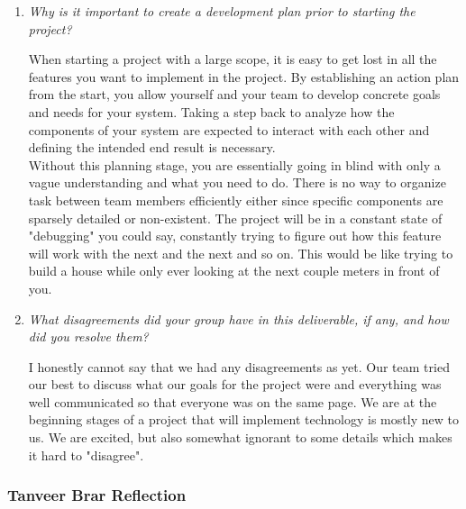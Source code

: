 \documentclass{article}
\begin{document}
\begin{enumerate}

  \item \textit{Why is it important to create a development plan prior to starting the project?}

    When starting a project with a large scope, it is easy to get lost in all the features you want to implement in the project.
    By establishing an action plan from the start, you allow yourself and your team to develop concrete goals and needs for your system. Taking a step back to analyze how the components of your system are expected to interact with each other and defining the intended end result is necessary.\\

    Without this planning stage, you are essentially going in blind with only a vague understanding and what you need to do. There is
    no way to organize task between team members efficiently either since specific components are sparsely detailed or non-existent. The
    project will be in a constant state of "debugging" you could say, constantly trying to figure out how this feature will work with the
    next and the next and so on. This would be like trying to build a house while only ever looking at the next couple meters in front of you.

  \item \textit{What disagreements did your group have in this deliverable, if any, and how did you resolve them?}
  
  I honestly cannot say that we had any disagreements as yet. Our team tried our best to discuss what our goals for the project were and
  everything was well communicated so that everyone was on the same page. We are at the beginning stages of a project that will implement
  technology is mostly new to us. We are excited, but also somewhat ignorant to some details which makes it hard to "disagree".

\end{enumerate}

\subsubsection*{Tanveer Brar Reflection}
\end{document}
